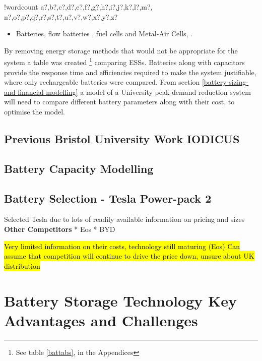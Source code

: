\documentclass[fontsize=9.5pt]{extarticle}
\numberwithin{figure}{section} %
\providecommand{\tightlist}{%
  \setlength{\itemsep}{0pt}\setlength{\parskip}{0pt}}
\newcounter{words}
\newenvironment{counted}{%
  \setcounter{words}{0}
  \SearchList!{wordcount}{\stepcounter{words}}
    {a?,b?,c?,d?,e?,f?,g?,h?,i?,j?,k?,l?,m?,
    n?,o?,p?,q?,r?,s?,t?,u?,v?,w?,x?,y?,z?}
  \UndoBoundary{'}
  \SearchOrder{p;}}{%
  \StopSearching}
\begin{document}
\begin{counted}
\begin{itemize}
  \begin{itemize}
  \tightlist
  \item
    Batteries, flow batteries \cite{flowbatstan}, fuel cells and
    Metal-Air Cells\cite{Chen2009291}, \cite{batuni}.
  \end{itemize}
\end{itemize}

By removing energy storage methods that would not be appropriate for the
system a table was created
\footnote{See table \ref{battabs}, in the Appendices} comparing ESSs.
Batteries along with capacitors provide the response time
\cite{Choudar201521} and efficiencies required to make the system
justifiable, where only rechargeable batteries were compared. From
section \ref{battery-sizing-and-financial-modelling} a model of a
University peak demand reduction system will need to compare different
battery parameters along with their cost, to optimise the model.

\subsection{Previous Bristol University Work
IODICUS}\label{previous-bristol-university-work-iodicus}

\subsection{Battery Capacity
Modelling}\label{battery-capacity-modelling}

\subsection{Battery Selection - Tesla Power-pack
2}\label{battery-selection---tesla-power-pack-2}

Selected Tesla due to lots of readily available information on pricing
and sizes \textbf{Other Competitors} * Eos * BYD

\hl{Very limited information on their costs, technology still maturing (Eos) Can assume that competition will continue to drive the price down, unsure about UK distribution}

\newpage

\section{Battery Storage Technology Key Advantages and
Challenges}\label{battery-storage-technology-key-advantages-and-challenges}


\end{counted}
\end{document}
